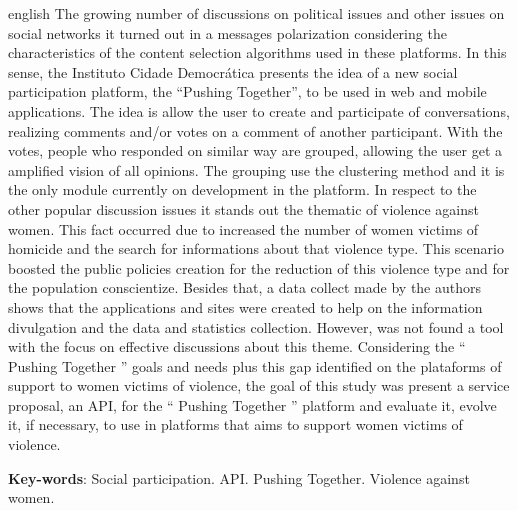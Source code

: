 \begin{resumo}[Abstract]
 \begin{otherlanguage*}{english}
  The growing number of discussions on political issues and other issues on social networks it turned out in a messages polarization considering the characteristics 
  of the content selection algorithms used in these platforms. In this sense, the Instituto Cidade Democrática presents the idea of a new social participation 
  platform, the ``Pushing Together'', to be used in web and mobile applications. The idea is allow the user to create and participate of conversations, realizing 
  comments and/or votes on a comment of another participant. With the votes, people who responded on similar way are grouped, allowing the user get a amplified 
  vision of all opinions. The grouping use the clustering method and it is the only module currently on development in the platform. In respect to the other popular 
  discussion issues it stands out the thematic of violence against women. This fact occurred due to increased the number of women victims of homicide and the search 
  for informations about that violence type. This scenario boosted the public policies creation for the reduction of this violence type and for the population 
  conscientize. Besides that, a data collect made by the authors shows that the applications and sites were created to help on the information divulgation and the 
  data and statistics collection. However, was not found a tool with the focus on effective discussions about this theme. 
  Considering the `` Pushing Together '' goals and needs plus this gap identified on the plataforms of support to women victims of violence, 
  the goal of this study was present a service proposal, an API, for the `` Pushing Together '' platform and evaluate it, evolve it, if necessary, 
  to use in platforms that aims to support women victims of violence.
  
  
   \vspace{\onelineskip}
 
   \noindent 
   \textbf{Key-words}: Social participation. API. Pushing Together. Violence against women.
 \end{otherlanguage*}
\end{resumo}
